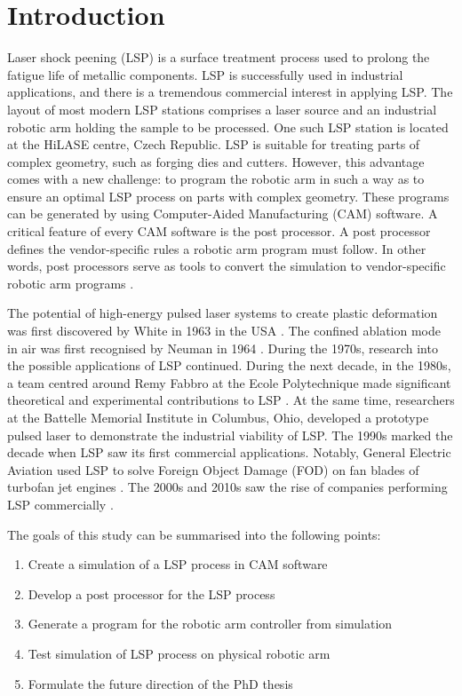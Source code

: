 \chapter{Introduction \label{ch:uvod}}




Laser shock peening (LSP) is a surface treatment process used to prolong the fatigue life of metallic components. LSP is successfully used in industrial applications, and there is a tremendous commercial interest in applying LSP. The layout of most modern LSP stations comprises a laser source and an industrial robotic arm holding the sample to be processed. One such LSP station is located at the HiLASE centre, Czech Republic. LSP is suitable for treating parts of complex geometry, such as forging dies and cutters. However, this advantage comes with a new challenge: to program the robotic arm in such a way as to ensure an optimal LSP process on parts with complex geometry. These programs can be generated by using Computer-Aided Manufacturing (CAM) software. A critical feature of every CAM software is the post processor. A post processor defines the vendor-specific rules a robotic arm program must follow.  In other words, post processors serve as tools to convert the simulation to vendor-specific robotic arm programs \cite{ding_ye_2006}.

The potential of high-energy pulsed laser systems to create plastic deformation was first discovered by White in 1963 in the USA \cite{white_1963}. The confined ablation mode in air was first recognised by Neuman in 1964 \cite{neuman_1964}. During the 1970s, research into the possible applications of LSP continued. During the next decade, in the 1980s, a team centred around Remy Fabbro at the Ecole Polytechnique made significant theoretical and experimental contributions to LSP \cite{fabbro_fournier_ballard_devaux_virmont_1990}. At the same time, researchers at the Battelle Memorial Institute in Columbus, Ohio, developed a prototype pulsed laser to demonstrate the industrial viability of LSP. The 1990s marked the decade when LSP saw its first commercial applications. Notably, General Electric Aviation used LSP to solve Foreign Object Damage (FOD) on fan blades of turbofan jet engines \cite{airforce}. The 2000s and 2010s saw the rise of companies performing LSP commercially \cite{sano}.

The goals of this study can be summarised into the following points:
\begin{enumerate}

    \item Create a simulation of a LSP process in CAM software
    \item Develop a post processor for the LSP process 
    \item Generate a program  for the robotic arm controller from simulation
    \item Test simulation of LSP process on physical robotic arm
    \item Formulate the future direction of the PhD thesis
    
\end{enumerate}

